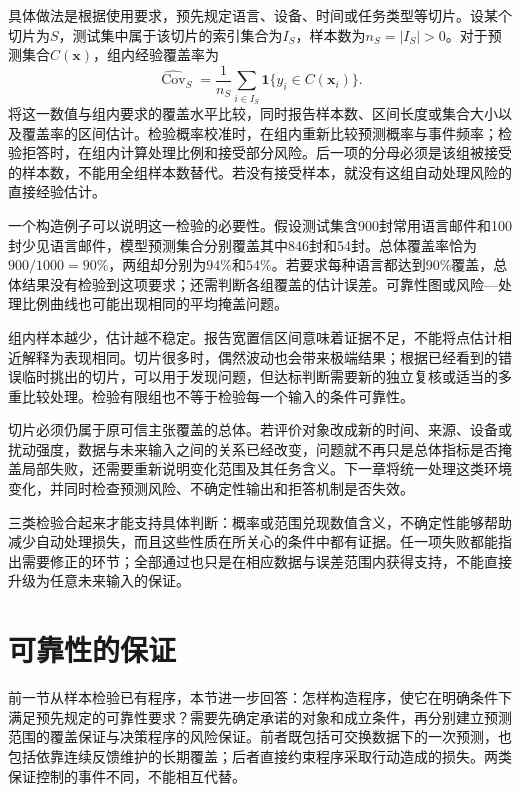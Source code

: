 具体做法是根据使用要求，预先规定语言、设备、时间或任务类型等切片。设某个切片为$S$，测试集中属于该切片的索引集合为$I_S$，样本数为$n_S=|I_S|>0$。对于预测集合$C(\bm{x})$，组内经验覆盖率为
\begin{equation}
 \widehat{\operatorname{Cov}}_S
 =\frac1{n_S}\sum_{i\in I_S}
   \mathbf1\{y_i\in C(\bm{x}_i)\}.
 \label{eq:reliability-group-coverage}
\end{equation}
将这一数值与组内要求的覆盖水平比较，同时报告样本数、区间长度或集合大小以及覆盖率的区间估计。检验概率校准时，在组内重新比较预测概率与事件频率；检验拒答时，在组内计算处理比例和接受部分风险。后一项的分母必须是该组被接受的样本数，不能用全组样本数替代。若没有接受样本，就没有这组自动处理风险的直接经验估计。

一个构造例子可以说明这一检验的必要性。假设测试集含900封常用语言邮件和100封少见语言邮件，模型预测集合分别覆盖其中846封和54封。总体覆盖率恰为$900/1000=90\%$，两组却分别为$94\%$和$54\%$。若要求每种语言都达到90\%覆盖，总体结果没有检验到这项要求；还需判断各组覆盖的估计误差。可靠性图或风险—处理比例曲线也可能出现相同的平均掩盖问题。

组内样本越少，估计越不稳定。报告宽置信区间意味着证据不足，不能将点估计相近解释为表现相同。切片很多时，偶然波动也会带来极端结果；根据已经看到的错误临时挑出的切片，可以用于发现问题，但达标判断需要新的独立复核或适当的多重比较处理。检验有限组也不等于检验每一个输入的条件可靠性。

切片必须仍属于原可信主张覆盖的总体。若评价对象改成新的时间、来源、设备或扰动强度，数据与未来输入之间的关系已经改变，问题就不再只是总体指标是否掩盖局部失败，还需要重新说明变化范围及其任务含义。下一章将统一处理这类环境变化，并同时检查预测风险、不确定性输出和拒答机制是否失效。

三类检验合起来才能支持具体判断：概率或范围兑现数值含义，不确定性能够帮助减少自动处理损失，而且这些性质在所关心的条件中都有证据。任一项失败都能指出需要修正的环节；全部通过也只是在相应数据与误差范围内获得支持，不能直接升级为任意未来输入的保证。

\section{可靠性的保证}
\label{sec:reliability-guarantee}

前一节从样本检验已有程序，本节进一步回答：怎样构造程序，使它在明确条件下满足预先规定的可靠性要求？需要先确定承诺的对象和成立条件，再分别建立预测范围的覆盖保证与决策程序的风险保证。前者既包括可交换数据下的一次预测，也包括依靠连续反馈维护的长期覆盖；后者直接约束程序采取行动造成的损失。两类保证控制的事件不同，不能相互代替。


